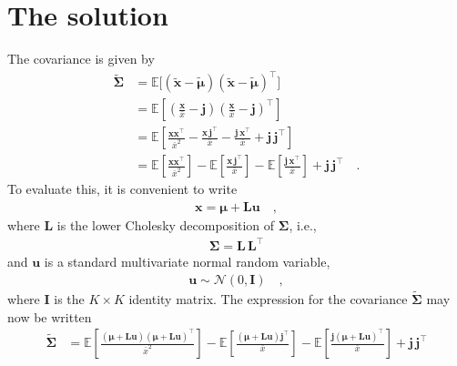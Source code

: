 \documentclass[modern]{aastex62}
\begin{document}
\section{The solution}

The covariance is given by
%
\begin{align}
    \tilde{\pmb{\Sigma}}
     & =
    \mathbb{E}\big[ (\tilde{\mathbf{x}} - \tilde{\pmb{\mu}}) (\tilde{\mathbf{x}} - \tilde{\pmb{\mu}} )^\top \big]
    \nonumber \\[0.5em]
     & =
    \mathbb{E}\left[
        \left(\frac{\mathbf{x}}{\bar{x}} - \mathbf{j}\right)
        \left(\frac{\mathbf{x}}{\bar{x}} - \mathbf{j}\right)^\top
        \right]
    \nonumber \\[0.5em]
     & =
    \mathbb{E}\left[
        \frac{\mathbf{x}\mathbf{x}^\top}{\bar{x}^2}
        -
        \frac{\mathbf{x}\,\mathbf{j}^\top}{\bar{x}}
        -
        \frac{\mathbf{j}\,\mathbf{x}^\top}{\bar{x}}
        +
        \mathbf{j} \, \mathbf{j}^\top
        \right]
    \nonumber \\[0.5em]
     & =
    \mathbb{E}\left[
        \frac{\mathbf{x}\mathbf{x}^\top}{\bar{x}^2}
        \right]
    -
    \mathbb{E}\left[
        \frac{\mathbf{x}\,\mathbf{j}^\top}{\bar{x}}
        \right]
    -
    \mathbb{E}\left[
        \frac{\mathbf{j}\,\mathbf{x}^\top}{\bar{x}}
        \right]
    +
    \mathbf{j} \, \mathbf{j}^\top
    \quad.
\end{align}
%
To evaluate this, it is convenient to write
%
\begin{align}
    \mathbf{x} = \pmb{\mu} + \mathbf{L} \mathbf{u}
    \quad,
\end{align}
%
where $\mathbf{L}$ is the lower Cholesky decomposition of $\pmb{\Sigma}$,
i.e.,
%
\begin{align}
    \pmb{\Sigma} = \mathbf{L}\,\mathbf{L}^\top
\end{align}
%
and $\mathbf{u}$ is a standard multivariate normal random variable,
%
\begin{align}
    \mathbf{u} \sim \mathcal{N}\left( 0, \mathbf{I} \right)
    \quad,
\end{align}
%
where $\mathbf{I}$ is the
$K \times K$ identity matrix.
The expression for the covariance $\tilde{\pmb{\Sigma}}$ may now be written
%
\begin{align}
    \label{eq:SigmaTildeExp}
    \tilde{\pmb{\Sigma}}
     & =
    \mathbb{E}\left[
        \frac{
            (\pmb{\mu} + \mathbf{L} \mathbf{u})(\pmb{\mu} + \mathbf{L} \mathbf{u})^\top
        }{
            \bar{x}^2
        }
        \right]
    -
    \mathbb{E}\left[
        \frac{
            (\pmb{\mu} + \mathbf{L} \mathbf{u})\mathbf{j}^\top
        }{
            \bar{x}
        }
        \right]
    -
    \mathbb{E}\left[
        \frac{
            \mathbf{j}(\pmb{\mu} + \mathbf{L} \mathbf{u})^\top
        }{
            \bar{x}
        }
        \right]
    +
    \mathbf{j} \, \mathbf{j}^\top
\end{align}
\end{document}
